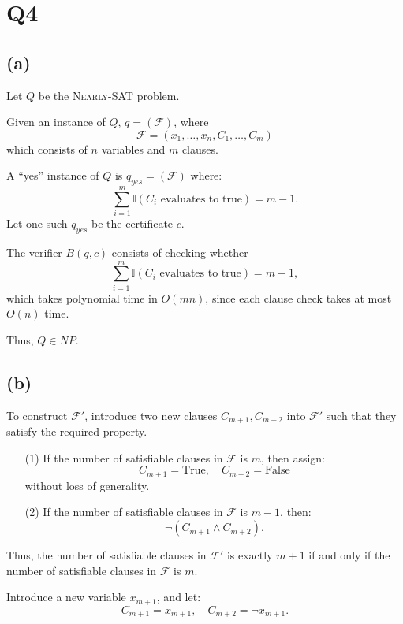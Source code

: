 \section*{Q4}


\subsection*{(a)}
Let \( Q \) be the \textsc{Nearly-SAT} problem.

Given an instance of \( Q \), \( q = (\mathcal{F}) \), where 
\[
\mathcal{F} = (x_1, \dots, x_n, C_1, \dots, C_m)
\]
which consists of \( n \) variables and \( m \) clauses.

A ``yes'' instance of \( Q \) is \( q_{yes} = (\mathcal{F}) \) where:
\[
\sum_{i=1}^{m} \mathbb{I}(C_i \text{ evaluates to true}) = m - 1.
\]
Let one such \( q_{yes} \) be the certificate \( c \).

The verifier \( B(q, c) \) consists of checking whether 
\[
\sum_{i=1}^{m} \mathbb{I}(C_i \text{ evaluates to true}) = m - 1,
\]
which takes polynomial time in \( O(mn) \), since each clause check takes at most \( O(n) \) time.

Thus, \( Q \in NP \).

\subsection*{(b)}
To construct \( \mathcal{F}' \), introduce two new clauses \( C_{m+1}, C_{m+2} \) into \( \mathcal{F}' \) such that they satisfy the required property.

\begin{enumerate}
    \item[(1)] If the number of satisfiable clauses in \( \mathcal{F} \) is \( m \), then assign:
    \[
    C_{m+1} = \text{True}, \quad C_{m+2} = \text{False}
    \]
    without loss of generality.
    
    \item[(2)] If the number of satisfiable clauses in \( \mathcal{F} \) is \( m - 1 \), then:
    \[
    \neg (C_{m+1} \land C_{m+2}).
    \]
\end{enumerate}

Thus, the number of satisfiable clauses in \( \mathcal{F}' \) is exactly \( m + 1 \) if and only if the number of satisfiable clauses in \( \mathcal{F} \) is \( m \).

Introduce a new variable \( x_{m+1} \), and let:
\[
C_{m+1} = x_{m+1}, \quad C_{m+2} = \neg x_{m+1}.
\]

